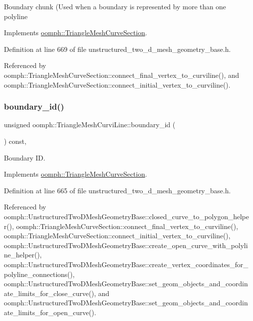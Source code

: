 Boundary chunk (Used when a boundary is represented by more than one polyline 

Implements \hyperlink{classoomph_1_1TriangleMeshCurveSection_a106d1f0e203e8e17c8296419be284c16}{oomph\+::\+Triangle\+Mesh\+Curve\+Section}.



Definition at line 669 of file unstructured\+\_\+two\+\_\+d\+\_\+mesh\+\_\+geometry\+\_\+base.\+h.



Referenced by oomph\+::\+Triangle\+Mesh\+Curve\+Section\+::connect\+\_\+final\+\_\+vertex\+\_\+to\+\_\+curviline(), and oomph\+::\+Triangle\+Mesh\+Curve\+Section\+::connect\+\_\+initial\+\_\+vertex\+\_\+to\+\_\+curviline().

\mbox{\label{classoomph_1_1TriangleMeshCurviLine_acb7ae5fdae67480a0e797da29d518aee}} 
\subsubsection{\texorpdfstring{boundary\+\_\+id()}{boundary\_id()}}
{\footnotesize\ttfamily unsigned oomph\+::\+Triangle\+Mesh\+Curvi\+Line\+::boundary\+\_\+id (\begin{DoxyParamCaption}{ }\end{DoxyParamCaption}) const\hspace{0.3cm}{\ttfamily [inline]}, {\ttfamily [virtual]}}



Boundary ID. 



Implements \hyperlink{classoomph_1_1TriangleMeshCurveSection_a2e6d22017ce7abe7e84e3f16360f5444}{oomph\+::\+Triangle\+Mesh\+Curve\+Section}.



Definition at line 665 of file unstructured\+\_\+two\+\_\+d\+\_\+mesh\+\_\+geometry\+\_\+base.\+h.



Referenced by oomph\+::\+Unstructured\+Two\+D\+Mesh\+Geometry\+Base\+::closed\+\_\+curve\+\_\+to\+\_\+polygon\+\_\+helper(), oomph\+::\+Triangle\+Mesh\+Curve\+Section\+::connect\+\_\+final\+\_\+vertex\+\_\+to\+\_\+curviline(), oomph\+::\+Triangle\+Mesh\+Curve\+Section\+::connect\+\_\+initial\+\_\+vertex\+\_\+to\+\_\+curviline(), oomph\+::\+Unstructured\+Two\+D\+Mesh\+Geometry\+Base\+::create\+\_\+open\+\_\+curve\+\_\+with\+\_\+polyline\+\_\+helper(), oomph\+::\+Unstructured\+Two\+D\+Mesh\+Geometry\+Base\+::create\+\_\+vertex\+\_\+coordinates\+\_\+for\+\_\+polyline\+\_\+connections(), oomph\+::\+Unstructured\+Two\+D\+Mesh\+Geometry\+Base\+::set\+\_\+geom\+\_\+objects\+\_\+and\+\_\+coordinate\+\_\+limits\+\_\+for\+\_\+close\+\_\+curve(), and oomph\+::\+Unstructured\+Two\+D\+Mesh\+Geometry\+Base\+::set\+\_\+geom\+\_\+objects\+\_\+and\+\_\+coordinate\+\_\+limits\+\_\+for\+\_\+open\+\_\+curve().

